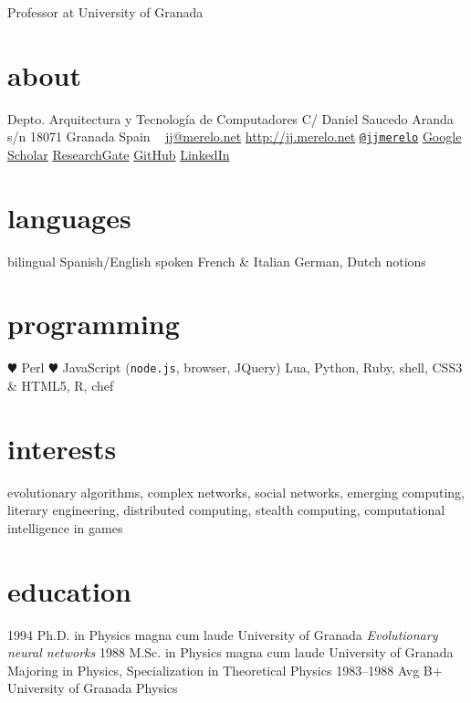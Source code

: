 \documentclass[]{friggeri-jj-cv}
\begin{document}
       {Professor at University of Granada}

\begin{aside}
  \section{about}
    Depto. Arquitectura y Tecnología de Computadores
    C/ Daniel Saucedo Aranda s/n
    18071 Granada
    Spain
    ~
    \href{mailto:jj@meremarbolo.net}{jj@merelo.net}
    \href{http://jj.merelo.net}{http://jj.merelo.net}
    \href{http://twitter.com/jjmerelo}{{\tt @jjmerelo}}
    \href{http://scholar.google.com/citations?user=gFxqc64AAAAJ}{Google Scholar}
   \href{https://www.researchgate.net/profile/JJ_Merelo}{ResearchGate}
   \href{https://github.com/JJ}{GitHub}
   \href{http://lnkd.in/dBVqYPa}{LinkedIn}
  \section{languages}
    bilingual Spanish/English
    spoken French \& Italian
    German, Dutch notions
  \section{programming}
    {\color{red} \large $\varheartsuit$} Perl
    {\color{red} $\varheartsuit$} JavaScript ({\tt node.js}, browser, JQuery)
    Lua, Python, Ruby, shell, CSS3 \& HTML5, R, chef
\end{aside}

\section{interests}

evolutionary algorithms, complex networks, social networks, emerging
computing, literary engineering, distributed computing, stealth
computing, computational intelligence in games

\section{education}

\begin{entrylist}
  \entry
    {1994}
    {Ph.D. {\normalfont in Physics} magna cum laude}
    {University of Granada}
    {\emph{Evolutionary neural networks}}
  \entry
    {1988}
    {M.Sc. {\normalfont in Physics} magna cum laude}
    {University of Granada}
    {Majoring in Physics, Specialization in Theoretical Physics}
  \entry
    {1983–1988}
    {Avg B+}
    {University of Granada}
    {Physics}
\end{entrylist}
\end{document}
